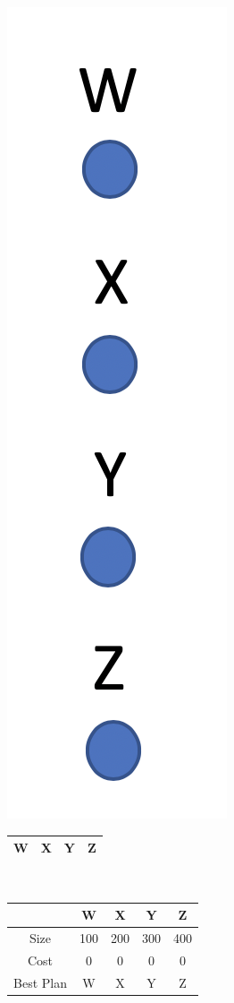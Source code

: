 \documentclass[12pt, letterpaper, fleqn]{article}
\begin{document}
\begin{center}
  \includegraphics[scale=0.25]{1_relation.png}
  \begin{tabular} {| c | c | c | c |}
  \hline
  W & X & Y & Z\\
  \hline
  \end{tabular}\\
  \begin{tabular} { c | c | c | c | c }
  & W & X & Y & Z \\
  \hline
  Size & 100  & 200  & 300 & 400\\
  Cost & 0    & 0    & 0   & 0 \\
  Best Plan & W & X & Y & Z \\
  \end{tabular}
\end{center}
\end{document}
